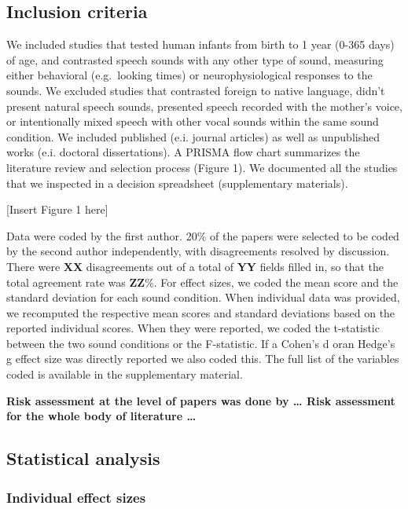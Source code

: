 \documentclass[man]{apa6}
\begin{document}
\subsection{Inclusion criteria}\label{inclusion-criteria}

We included studies that tested human infants from birth to 1 year
(0-365 days) of age, and contrasted speech sounds with any other type of
sound, measuring either behavioral (e.g.~looking times) or
neurophysiological responses to the sounds. We excluded studies that
contrasted foreign to native language, didn't present natural speech
sounds, presented speech recorded with the mother's voice, or
intentionally mixed speech with other vocal sounds within the same sound
condition. We included published (e.i. journal articles) as well as
unpublished works (e.i. doctoral dissertations). A PRISMA flow chart
summarizes the literature review and selection process (Figure 1). We
documented all the studies that we inspected in a decision spreadsheet
(supplementary materials).

{[}Insert Figure 1 here{]}

Data were coded by the first author. 20\% of the papers were selected to
be coded by the second author independently, with disagreements resolved
by discussion. There were \textbf{XX} disagreements out of a total of
\textbf{YY} fields filled in, so that the total agreement rate was
\textbf{ZZ}\%. For effect sizes, we coded the mean score and the
standard deviation for each sound condition. When individual data was
provided, we recomputed the respective mean scores and standard
deviations based on the reported individual scores. When they were
reported, we coded the t-statistic between the two sound conditions or
the F-statistic. If a Cohen's d oran Hedge's g effect size was directly
reported we also coded this. The full list of the variables coded is
available in the supplementary material.

\textbf{Risk assessment at the level of papers was done by \ldots{} Risk
assessment for the whole body of literature \ldots{}}

\subsection{Statistical analysis}\label{statistical-analysis}

\subsubsection{Individual effect sizes}\label{individual-effect-sizes}
\end{document}
